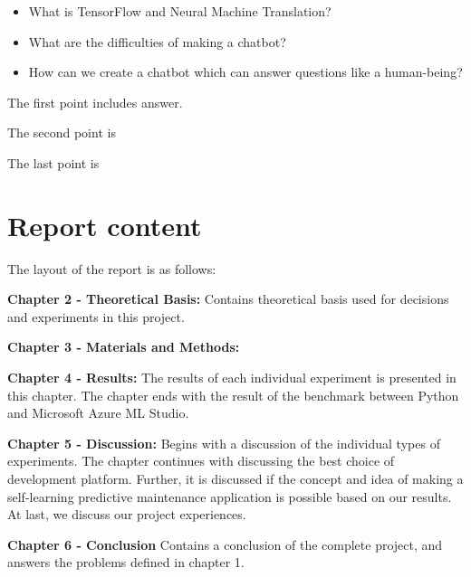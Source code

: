 \documentclass[english, a4paper]{report}
\begin{document}
{{        \begin{itemize}
        \item What is TensorFlow and Neural Machine Translation? 
        \par
        \item What are the difficulties of making a chatbot?
        \par
    	\item How can we create a chatbot which can answer questions like a human-being?
    	\end{itemize}
    	
    	\par 	
    	The first point includes  answer. 
    	\par
    	The second point is 
    	\par 
    	The last point is 
    	\par
    	
    }
    
    \section{Report content}
    {
        The layout of the report is as follows:
        \par
        \textbf{Chapter 2 - Theoretical Basis:} Contains theoretical basis used for decisions and experiments in this project.
        \par
        \textbf{Chapter 3 - Materials and Methods:} 
        \par
        \textbf{Chapter 4 - Results:} The results of each individual experiment is presented in this chapter. The chapter ends with the result of the benchmark between Python and Microsoft Azure ML Studio.
        \par
        \textbf{Chapter 5 - Discussion:} Begins with a discussion of the individual types of experiments. The chapter continues with discussing the best choice of development platform. Further, it is discussed if the concept and idea of making a self-learning predictive maintenance application is possible based on our results. At last, we discuss our project experiences.   
        \par
        \textbf{Chapter 6 - Conclusion} Contains a conclusion of the complete project, and answers the problems defined in chapter 1.
    }
}

\newpage
\end{document}
